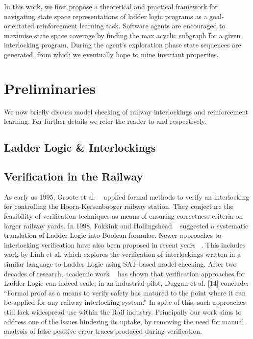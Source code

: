 \documentclass[conference,compsoc]{IEEEtran}
\begin{document}
In this work, we first propose a theoretical and practical framework for navigating state space representations of ladder logic programs as a goal-orientated reinforcement learning task. Software agents are encouraged to maximise state space coverage by finding the max acyclic subgraph for a given interlocking program. During the agent's exploration phase state sequences are generated, from which we eventually hope to mine invariant properties. 




\section{Preliminaries}\label{sec:preliminaries}
We now briefly discuss  model checking of railway interlockings and reinforcement learning. For further details we refer the reader to \cite{kanso2009automated, james2013verification} and \cite{mnih2016asynchronous} respectively.

\subsection{Ladder Logic \& Interlockings}

\subsection{Verification in the Railway}
As early as 1995, Groote
et al. ~\cite{groote1995safety} applied formal methods to verify an interlocking for controlling the Hoorn-Kersenbooger railway station. They conjecture the feasibility of verification techniques
as means of ensuring correctness criteria on larger railway yards. In 1998, Fokkink
and Hollingshead ~\cite{fokkink1998verification} suggested a systematic translation of Ladder Logic into Boolean
formulae. Newer approaches to interlocking verification have also been proposed in recent
years ~\cite{fantechi2012some, ferrari2011model, haxthausen2008modelling}. This includes work by Linh et al. which explores the verification
of interlockings written in a similar language to Ladder Logic using SAT-based model
checking. After two decades of research, academic work ~\cite{kanso2009automated, james2013verification} has shown that verification
approaches for Ladder Logic can indeed scale; in an industrial pilot, Duggan et al. [14] conclude: “Formal proof as a means to verify safety has matured to the point where it
can be applied for any railway interlocking system.” In spite of this, such approaches still lack widespread use within the Rail industry. Principally our work aims to address one of the issues hindering its uptake, by removing the need for manual analysis of false positive error traces produced during verification.
\end{document}
